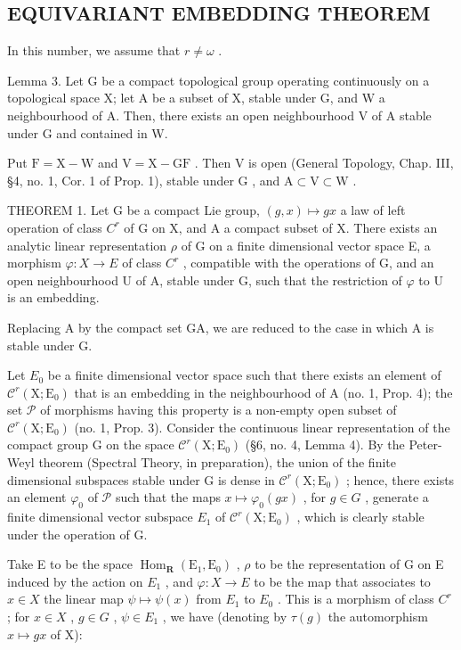 \subsection{EQUIVARIANT EMBEDDING THEOREM}

In this number, we assume that \(r \neq \omega\) .

Lemma 3. Let G be a compact topological group operating continuously on a topological space X; let A be a subset of X, stable under G, and W a neighbourhood of A. Then, there exists an open neighbourhood V of A stable under G and contained in W.

Put \(\mathrm{F} = \mathrm{X} - \mathrm{W}\) and \(\mathrm{V} = \mathrm{X} - \mathrm{GF}\) . Then \(\mathrm{V}\) is open (General Topology, Chap. III, §4, no. 1, Cor. 1 of Prop. 1), stable under \(\mathrm{G}\) , and \(\mathrm{A} \subset \mathrm{V} \subset \mathrm{W}\) .

THEOREM 1. Let G be a compact Lie group, \((g,x)\mapsto gx\) a law of left operation of class \(C^{r}\) of G on X, and A a compact subset of X. There exists an analytic linear representation \(\rho\) of G on a finite dimensional vector space E, a morphism \(\varphi:X\to E\) of class \(C^{r}\) , compatible with the operations of G, and an open neighbourhood U of A, stable under G, such that the restriction of \(\varphi\) to U is an embedding.

Replacing A by the compact set GA, we are reduced to the case in which A is stable under G.

Let \(E_0\) be a finite dimensional vector space such that there exists an element of \(\mathcal{C}^r(\mathrm{X};\mathrm{E}_0)\) that is an embedding in the neighbourhood of A (no. 1, Prop. 4); the set \(\mathcal{P}\) of morphisms having this property is a non-empty open subset of \(\mathcal{C}^r(\mathrm{X};\mathrm{E}_0)\) (no. 1, Prop. 3). Consider the continuous linear representation of the compact group G on the space \(\mathcal{C}^r(\mathrm{X};\mathrm{E}_0)\) (§6, no. 4, Lemma 4). By the Peter-Weyl theorem (Spectral Theory, in preparation), the union of the finite dimensional subspaces stable under G is dense in \(\mathcal{C}^r(\mathrm{X};\mathrm{E}_0)\) ; hence, there exists an element \(\varphi_0\) of \(\mathcal{P}\) such that the maps \(x \mapsto \varphi_0(gx)\) , for \(g \in G\) , generate a finite dimensional vector subspace \(E_1\) of \(\mathcal{C}^r(\mathrm{X};\mathrm{E}_0)\) , which is clearly stable under the operation of G.

Take E to be the space \(\operatorname{Hom}_{\mathbf{R}}(\mathrm{E}_{1},\mathrm{E}_{0})\) , \(\rho\) to be the representation of G on E induced by the action on \(E_{1}\) , and \(\varphi:X\to E\) to be the map that associates to \(x\in X\) the linear map \(\psi\mapsto\psi(x)\) from \(E_{1}\) to \(E_{0}\) . This is a morphism of class \(C^{r}\) ; for \(x\in X\) , \(g\in G\) , \(\psi\in E_{1}\) , we have (denoting by \(\tau(g)\) the automorphism \(x\mapsto gx\) of X):

